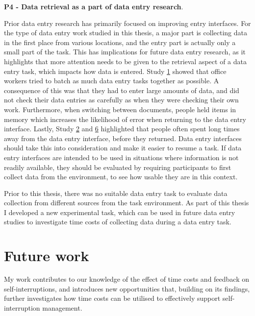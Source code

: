 \textbf{P4 - Data retrieval as a part of data entry research}. 

Prior data entry research has primarily focused on improving entry interfaces. For the type of data entry work studied in this thesis, a major part is collecting data in the first place from various locations, and the entry part is actually only a small part of the task. This has implications for future data entry research, as it highlights that more attention needs to be given to the retrieval aspect of a data entry task, which impacts how data is entered. Study \hyperref[st:Study1]{1} showed that office workers tried to batch as much data entry tasks together as possible. A consequence of this was that they had to enter large amounts of data, and did not check their data entries as carefully as when they were checking their own work. Furthermore, when switching between documents, people held items in memory which increases the likelihood of error when returning to the data entry interface. Lastly, Study \hyperref[st:Study2]{2} and \hyperref[st:Study6]{6} highlighted that people often spent long times away from the data entry interface, before they returned. Data entry interfaces should take this into consideration and make it easier to resume a task. If data entry interfaces are intended to be used in situations where information is not readily available, they should be evaluated by requiring participants to first collect data from the environment, to see how usable they are in this context.

Prior to this thesis, there was no suitable data entry task to evaluate data collection from different sources from the task environment. As part of this thesis I developed a new experimental task, which can be used in future data entry studies to investigate time costs of collecting data during a data entry task.

\section{Future work}
My work contributes to our knowledge of the effect of time costs and feedback on self-interruptions, and introduces new opportunities that, building on its findings, further investigates how time costs can be utilised to effectively support self-interruption management.


